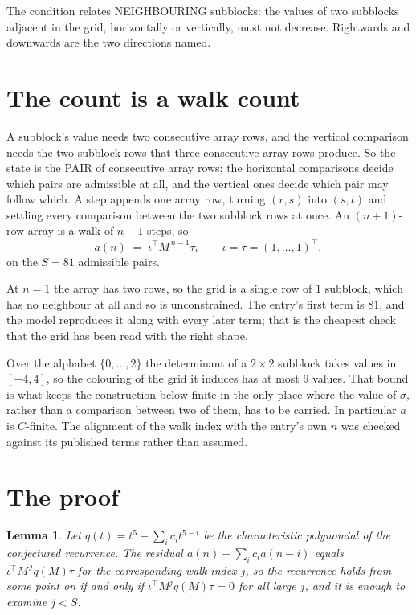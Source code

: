 \documentclass[11pt,a4paper]{article}
\theoremstyle{plain}
\newtheorem{lemma}[theorem]{Lemma}
\theoremstyle{definition}
\begin{document}
The condition relates NEIGHBOURING subblocks: the values of two subblocks adjacent in the grid,
horizontally or vertically, must not decrease. Rightwards and downwards are the two directions named.

\section{The count is a walk count}

A subblock's value needs two consecutive array rows, and the vertical
comparison needs the two subblock rows that three consecutive array rows produce. So the state
is the PAIR of consecutive array rows: the horizontal comparisons decide which pairs are
admissible at all, and the vertical ones decide which pair may follow which. A step appends one
array row, turning $(r,s)$ into $(s,t)$ and settling every comparison between the two subblock
rows at once. An $(n+1)$-row array is a walk of $n-1$ steps, so
\[
a(n)\;=\;\iota^{\!\top}M^{\,n-1}\tau,\qquad\iota=\tau=(1,\dots,1)^{\!\top},
\]
on the $S=81$ admissible pairs.

At $n=1$ the array has two rows, so the grid is a single row of $1$
subblock, which has no neighbour at all and so is unconstrained. The
entry's first term is $81$, and the model reproduces it along with every later term; that
is the cheapest check that the grid has been read with the right shape.

Over the alphabet $\{0,\dots,2\}$ the determinant of a $2\times2$ subblock takes values in
$[-4,4]$, so the colouring of the grid it induces has at most $9$ values.
That bound is what keeps the construction below finite in the only place where the value of
$\sigma$, rather than a comparison between two of them, has to be carried.
In particular $a$ is $C$-finite. The alignment of the walk index with the entry's own $n$ was
checked against its published terms rather than assumed.

\section{The proof}

\begin{lemma}\label{lem:crit}
Let $q(t)=t^{5}-\sum_i c_it^{5-i}$ be the characteristic polynomial of the
conjectured recurrence. The residual $a(n)-\sum_ic_ia(n-i)$ equals
$\iota^{\!\top}M^{\,j}q(M)\tau$ for the corresponding walk index $j$, so the recurrence
holds from some point on if and only if $\iota^{\!\top}M^{j}q(M)\tau=0$ for all large $j$,
and it is enough to examine $j<S$.
\end{lemma}
\end{document}
